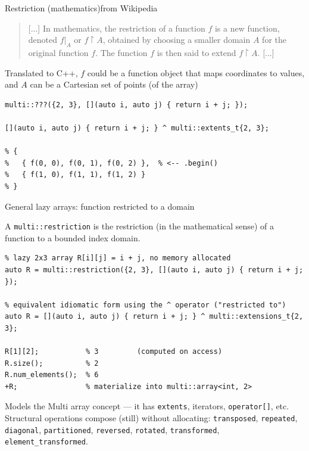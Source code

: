 \documentclass[t,aspectratio=169,handout]{beamer}
\begin{document}
\begin{frame}[fragile]{Restriction (mathematics)}{from Wikipedia}
\begin{quote}
  [...] In mathematics, the restriction of a function \(f\)
  is a new function, denoted \(f |_A\) or \(f \upharpoonright A\),
  obtained by choosing a smaller domain \(A\)
  for the original function \(f\).
  The function \(f\) is then said to extend \(f \upharpoonright A\). [...]
\end{quote}


Translated to C++, \(f\) could be a function object that maps coordinates to values, and
\(A\) can be a Cartesian set of points (of the array)

\pause

\begin{lstlisting}
multi::???({2, 3}, [](auto i, auto j) { return i + j; });

[](auto i, auto j) { return i + j; } ^ multi::extents_t{2, 3};

% {
%   { f(0, 0), f(0, 1), f(0, 2) },  % <-- .begin()
%   { f(1, 0), f(1, 1), f(1, 2) }
% }
\end{lstlisting}

\end{frame}

\begin{frame}[fragile]{General lazy arrays: function restricted to a domain}

A \lstinline|multi::restriction|
is the restriction (in the mathematical sense) of a function to a bounded index domain.

\begin{lstlisting}
% lazy 2x3 array R[i][j] = i + j, no memory allocated
auto R = multi::restriction({2, 3}, [](auto i, auto j) { return i + j; });

% equivalent idiomatic form using the ^ operator ("restricted to")
auto R = [](auto i, auto j) { return i + j; } ^ multi::extensions_t{2, 3};

R[1][2];           % 3         (computed on access)
R.size();          % 2
R.num_elements();  % 6
+R;                % materialize into multi::array<int, 2>
\end{lstlisting}

\medskip
Models the Multi array concept --- it has \lstinline|extents|, iterators, \lstinline|operator[]|, etc.\\
Structural operations compose (still) without allocating: \lstinline|transposed|, \lstinline|repeated|, \lstinline|diagonal|, \lstinline|partitioned|, \lstinline|reversed|, \lstinline|rotated|, \lstinline|transformed|, \lstinline|element_transformed|.
\end{frame}
\end{document}
